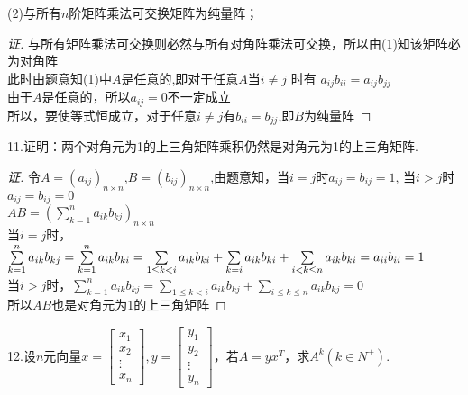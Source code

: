 \documentclass[10pt,a4paper]{report}
\begin{document}
\noindent (2)与所有$n$阶矩阵乘法可交换矩阵为纯量阵；
\begin{proof}[证]
	与所有矩阵乘法可交换则必然与所有对角阵乘法可交换，所以由(1)知该矩阵必为对角阵\\
	此时由题意知(1)中$A$是任意的,即对于任意$A$当$i \neq j$ 时有
	$
	a_{ij}b_{ii} = a_{ij}b_{jj}
	$\\
	由于$A$是任意的，所以$a_{ij} = 0$不一定成立\\
	所以，要使等式恒成立，对于任意$i \neq j$有$b_{ii} = b_{jj}$,即$B$为纯量阵
\end{proof}
\noindent 11.证明：两个对角元为1的上三角矩阵乘积仍然是对角元为1的上三角矩阵.
\begin{proof}[证]
	令$A=(a_{ij})_{n \times n}$,$B=(b_{ij})_{n \times n}$,由题意知，当$i = j$时$a_{ij} = b_{ij}= 1$, 当$i > j$时$a_{ij} = b_{ij} = 0$\\
	$AB = (\sum\limits_{k=1}^{n}a_{ik}b_{kj})_{n \times n}$\\
	当$i = j$时，$\sum\limits_{k=1}^{n}a_{ik}b_{kj} = \sum\limits_{k=1}^{n}a_{ik}b_{ki}\\
	= \sum\limits_{1 \leq k < i}a_{ik}b_{ki} + \sum\limits_{k=i}a_{ik}b_{ki} + \sum\limits_{i < k \leq n}a_{ik}b_{ki} = a_{ii}b_{ii} = 1$\\
	当$i > j$时，$\sum\limits_{k=1}^{n}a_{ik}b_{kj} = \sum\limits_{1 \leq k < i}a_{ik}b_{kj} + \sum\limits_{i \leq k \leq n}a_{ik}b_{kj} = 0$\\
	所以$AB$也是对角元为1的上三角矩阵
\end{proof}
\noindent 12.设$n$元向量$
x=\left[
\begin{matrix}
x_{1} \\
x_{2} \\
\vdots \\
x_{n}
\end{matrix}
\right]
,
y=\left[
\begin{matrix}
y_{1} \\
y_{2} \\
\vdots \\
y_{n}
\end{matrix}
\right]
$，若$A=yx^{T}$，求$A^{k}(k \in N^{+})$.
\end{document}

